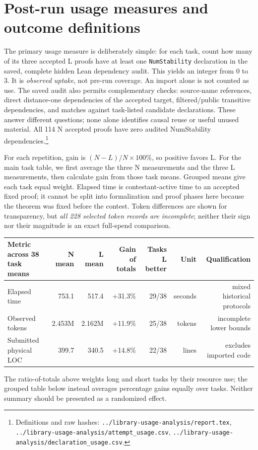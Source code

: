 \documentclass[10pt]{article}
\newcommand{\pathref}[1]{\nolinkurl{#1}}
\begin{document}
\section{Post-run usage measures and outcome definitions}
The primary usage measure is deliberately simple: for each task, count how many of its three accepted L proofs have at least one \texttt{NumStability} declaration in the saved, complete hidden Lean dependency audit. This yields an integer from 0 to 3. It is \emph{observed uptake}, not pre-run coverage. An import alone is not counted as use. The saved audit also permits complementary checks: source-name references, direct distance-one dependencies of the accepted target, filtered/public transitive dependencies, and matches against task-listed candidate declarations. These answer different questions; none alone identifies causal reuse or useful unused material. All 114 N accepted proofs have zero audited NumStability dependencies.\footnote{Definitions and raw hashes: \pathref{../library-usage-analysis/report.tex}, \pathref{../library-usage-analysis/attempt_usage.csv}, \pathref{../library-usage-analysis/declaration_usage.csv}.}

For each repetition, gain is $(N-L)/N\times100\%$, so positive favors L. For the main task table, we first average the three N measurements and the three L measurements, then calculate gain from those task means. Grouped means give each task equal weight. Elapsed time is contestant-active time to an accepted fixed proof; it cannot be split into formalization and proof phases here because the theorem was fixed before the contest. Token differences are shown for transparency, but \emph{all 228 selected token records are incomplete}; neither their sign nor their magnitude is an exact full-spend comparison.

\begin{center}\small
\begin{tabular}{@{}lrrrrrr@{}}\toprule
Metric across 38 task means & N mean & L mean & Gain of totals & Tasks L better & Unit & Qualification \\\midrule
Elapsed time & 753.1 & 517.4 & +31.3\% & 29/38 & seconds & mixed historical protocols \\
Observed tokens & 2.453M & 2.162M & +11.9\% & 25/38 & tokens & incomplete lower bounds \\
Submitted physical LOC & 399.7 & 340.5 & +14.8\% & 22/38 & lines & excludes imported code \\
\bottomrule\end{tabular}
\end{center}
The ratio-of-totals above weights long and short tasks by their resource use; the grouped table below instead averages percentage gains equally over tasks. Neither summary should be presented as a randomized effect.
\end{document}
